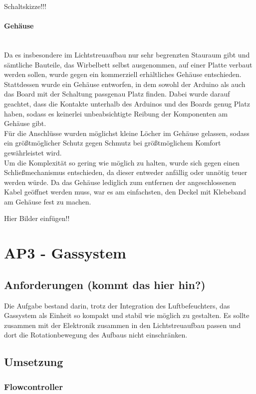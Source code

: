 Schaltskizze!!!

\paragraph{Gehäuse}
\hfill \\
Da es insbesondere im Lichtstreuaufbau nur sehr begrenzten Stauraum gibt und sämtliche Bauteile, das Wirbelbett selbst ausgenommen, auf einer Platte verbaut werden sollen, wurde gegen ein kommerziell erhältliches Gehäuse entschieden. \\ 
Stattdessen wurde ein Gehäuse entworfen, in dem sowohl der Arduino als auch das Board mit der Schaltung passgenau Platz finden. Dabei wurde darauf geachtet, dass die Kontakte unterhalb des Arduinos und des Boards genug Platz haben, sodass es keinerlei unbeabsichtigte Reibung der Komponenten am Gehäuse gibt. \\
Für die Anschlüsse wurden möglichst kleine Löcher im Gehäuse gelassen, sodass ein größtmöglicher Schutz gegen Schmutz bei größtmöglichem Komfort gewährleistet wird. \\
Um die Komplexität so gering wie möglich zu halten, wurde sich gegen einen Schließmechanismus entschieden, da dieser entweder anfällig oder unnötig teuer werden würde. Da das Gehäuse lediglich zum entfernen der angeschlossenen Kabel geöffnet werden muss, war es am einfachsten, den Deckel mit Klebeband am Gehäuse fest zu machen.

Hier Bilder einfügen!!


\section{AP3 - Gassystem}

\subsection{Anforderungen (kommt das hier hin?)}

Die Aufgabe bestand darin, trotz der Integration des Luftbefeuchters, das Gassystem als Einheit so kompakt und stabil wie möglich zu gestalten. Es sollte zusammen mit der Elektronik zusammen in den Lichtstreuaufbau passen und dort die Rotationbewegung des Aufbaus nicht einschränken.


\subsection{Umsetzung}

\subsubsection{Flowcontroller}

